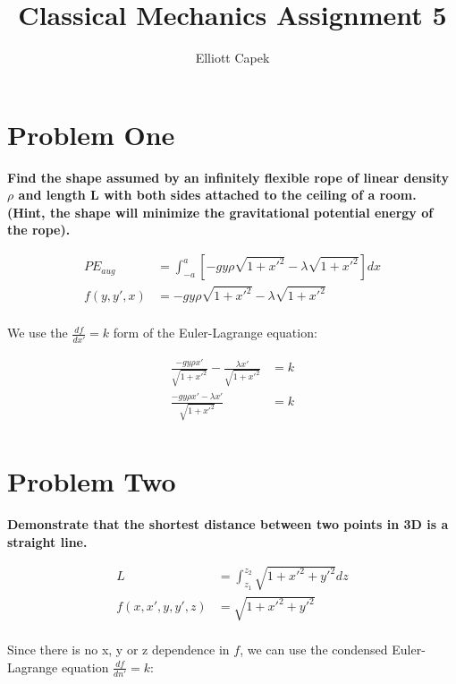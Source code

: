 \documentclass[10pt]{article} %
\title{Classical Mechanics Assignment 5}
\author{Elliott Capek}
\begin{document}
\maketitle{}

\section{Problem One}
\textbf{Find the shape assumed by an infinitely flexible rope of linear density $\rho$ and length L with both sides attached to the ceiling of a room. (Hint, the shape will minimize the gravitational potential energy of the rope).}

\begin{align*}
  PE_{aug} &= \int_{-a}^{a} \left[-gy\rho \sqrt{1 + x'^2} - \lambda\sqrt{1+x'^2}\right]dx\\
  f(y,y',x) &= -gy\rho \sqrt{1 + x'^2} - \lambda\sqrt{1+x'^2}\\
\end{align*}

We use the $\frac{df}{dx'} = k$ form of the Euler-Lagrange equation:

\begin{align*}
  \frac{-gy\rho x'}{\sqrt{1 + x'^2}} - \frac{\lambda x'}{\sqrt{1+x'^2}} &= k\\
  \frac{-gy\rho x' - \lambda x'}{\sqrt{1 + x'^2}} &= k\\
\end{align*}

\section{Problem Two}
\textbf{Demonstrate that the shortest distance between two points in 3D is a straight line.}

\begin{align*}
  L &= \int_{z_1}^{z_2} \sqrt{1 + x'^2 + y'^2} dz\\
  f(x, x', y, y', z) &= \sqrt{1 + x'^2 + y'^2}\\
\end{align*}

Since there is no x, y or z dependence in $f$, we can use the condensed Euler-Lagrange equation $\frac{df}{dn'} = k$:\\
\end{document}
